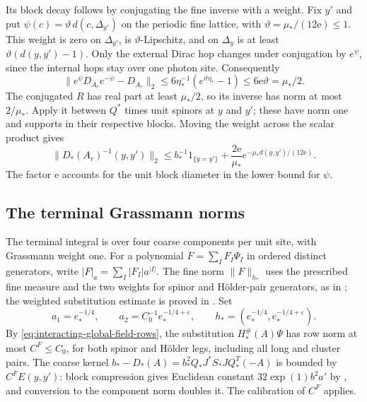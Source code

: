 \documentclass[11pt,letterpaper,reqno]{amsart}
\begin{document}
Its block decay follows by conjugating the fine
inverse with a weight. Fix $y'$ and put
$\psi(c)=\vartheta\,d(c,\Delta_{y'})$ on the
periodic fine lattice, with
$\vartheta=\mu_*/(12\mathrm e)\le1$.
This weight is zero on $\Delta_{y'}$, is
$\vartheta$-Lipschitz, and on $\Delta_y$ is
at least $\vartheta(d(y,y')-1)$.
Only the external Dirac hop changes under
conjugation by $e^\psi$, since the internal
hops stay over one photon site. Consequently
\[
 \|e^\psi D_{A_r}e^{-\psi}-D_{A_r}\|_2
 \le6\eta_*^{-1}(e^{\vartheta\eta_*}-1)
 \le6\mathrm e\vartheta=\mu_*/2.
\]
The conjugated $R$ has real part at least
$\mu_*/2$, so its inverse has norm at most
$2/\mu_*$. Apply it between $Q^*$ times
unit spinors at $y$ and $y'$; these have
norm one and supports in their respective
blocks. Moving the weight across the
scalar product gives
\begin{equation}\label{eq:interacting-real-covariance-decay}
 \|D_*(A_r)^{-1}(y,y')\|_2
  \le b_*^{-1}1_{\{y=y'\}}+
       \frac{2\mathrm e}{\mu_*}
                       e^{-\mu_*d(y,y')/(12\mathrm e)}.
\end{equation}
The factor $\mathrm e$ accounts for the unit
block diameter in the lower bound for $\psi$.
\subsection{The terminal Grassmann norms}
\label{subsec:interacting-terminal-norms}

The terminal integral is over four coarse
components per unit site, with Grassmann
weight one. For a polynomial
$F=\sum_I F_I\Psi_I$ in ordered distinct generators,
write $|F|_a=\sum_I|F_I|a^{|I|}$.
The fine norm $\|F\|_{h_*}$ uses the prescribed fine measure
and the two weights for spinor and H\"older-pair generators,
as in \cite[(4)--(5)]{NormalizedContraction};
the weighted substitution estimate is proved in
\cite[Proposition~5.1]{FermionBlock}.
Set
\[
 a_1=e_*^{-1/4},\qquad
 a_2=C_0^{-1}e_*^{-1/4+\varepsilon},\qquad
 h_*=(e_*^{-1/4},e_*^{-1/4+\varepsilon}).
\]
By \eqref{eq:interacting-global-field-rows},
the substitution $H_*^\#(A)\Psi$ has row
norm at most $C^F\le C_0$, for both spinor
and H\"older legs, including all long
and cluster pairs. The coarse kernel
$b_*-D_*(A)=b_*^2Q_*J^*S_*JQ_*^T(-A)$
is bounded by $C^FE(y,y')$: block
compression gives Euclidean constant
$32\exp(1)b^2a'$ by
\cite[(60)]{FermionBlock}, and
conversion to the component norm doubles
it. The calibration of $C^F$ applies.
\end{document}
